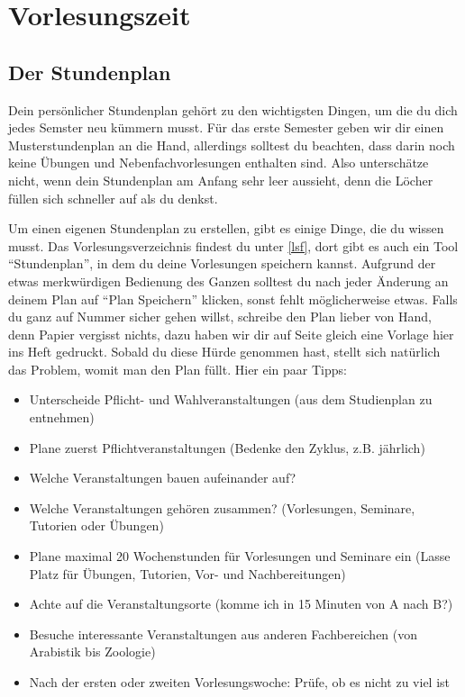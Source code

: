 ﻿\chapter{Vorlesungszeit}

\section{Der Stundenplan}

Dein persönlicher Stundenplan gehört zu den wichtigsten Dingen, um die du dich jedes Semster neu kümmern musst.
Für das erste Semester geben wir dir einen Musterstundenplan an die Hand, allerdings solltest du beachten, dass darin noch keine Übungen und Nebenfachvorlesungen enthalten sind. Also unterschätze nicht, wenn dein Stundenplan am Anfang sehr leer aussieht, denn die Löcher füllen sich schneller auf als du denkst.

Um einen eigenen Stundenplan zu erstellen, gibt es einige Dinge, die du wissen
musst. Das Vorlesungsverzeichnis findest du unter \ref{lsf}, dort gibt es auch
ein Tool ``Stundenplan'', in dem du deine Vorlesungen speichern kannst.
Aufgrund der etwas merkwürdigen Bedienung des Ganzen solltest du nach jeder
Änderung an deinem Plan auf ``Plan Speichern'' klicken, sonst fehlt
möglicherweise etwas. Falls du ganz auf Nummer sicher gehen willst, schreibe den
Plan lieber von Hand, denn Papier vergisst nichts, dazu haben wir dir auf Seite
\pageref{studenplan} gleich eine Vorlage hier ins Heft gedruckt. Sobald du
diese Hürde genommen hast, stellt sich natürlich das Problem, womit man den
Plan füllt. Hier ein paar Tipps:

\begin{itemize}
	\item Unterscheide Pflicht- und Wahlveranstaltungen (aus dem Studienplan zu entnehmen)
	\item Plane zuerst Pflichtveranstaltungen (Bedenke den Zyklus, z.B. jährlich)
	\item Welche Veranstaltungen bauen aufeinander auf?
	\item Welche Veranstaltungen gehören zusammen? (Vorlesungen, Seminare, Tutorien oder Übungen)
	\item Plane maximal 20 Wochenstunden für Vorlesungen und Seminare ein (Lasse Platz für Übungen, Tutorien, Vor- und Nachbereitungen)
	\item Achte auf die Veranstaltungsorte (komme ich in 15 Minuten von A nach B?)
	\item Besuche interessante Veranstaltungen aus anderen Fachbereichen (von Arabistik bis Zoologie)
	\item Nach der ersten oder zweiten Vorlesungswoche: Prüfe, ob es nicht zu viel ist
\end{itemize}

